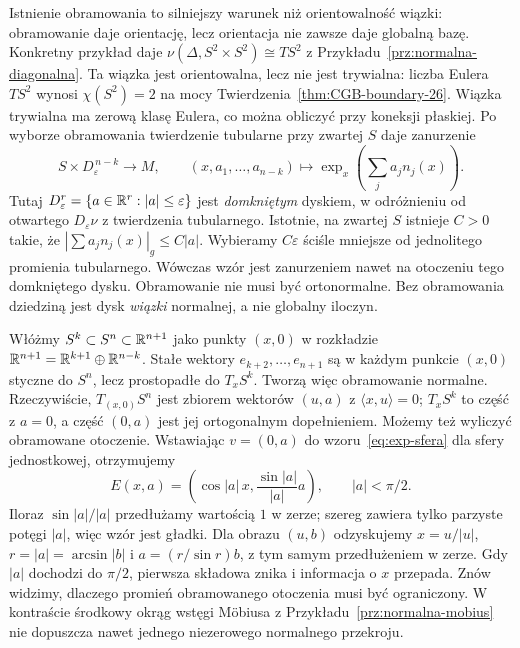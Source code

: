 Istnienie obramowania to silniejszy
warunek niż orientowalność wiązki:
obramowanie daje orientację, lecz
orientacja nie zawsze daje globalną
bazę. Konkretny przykład daje
$\nu(\Delta,S^2\times S^2)\cong TS^2$
z Przykładu~\ref{prz:normalna-diagonalna}.
Ta wiązka jest orientowalna, lecz nie jest trywialna:
liczba Eulera $TS^2$ wynosi $\chi(S^2)=2$
na mocy Twierdzenia~\ref{thm:CGB-boundary-26}.
Wiązka trywialna ma zerową klasę Eulera, co można obliczyć
przy koneksji płaskiej.
Po wyborze obramowania
twierdzenie tubularne przy zwartej
$S$ daje zanurzenie
\begin{equation}\label{eq:obramowany-dysk}
 S\times D^{\,n-k}_{\varepsilon}
 \longrightarrow M,\qquad
 (x,a_1,\ldots,a_{n-k})
 \longmapsto
 \exp_x\!\left(\sum_j a_jn_j(x)\right).
\end{equation}
Tutaj $D^r_\varepsilon=\{a\in\mathbb{R}^r:|a|\leq\varepsilon\}$
jest \emph{domkniętym} dyskiem, w odróżnieniu od otwartego
$D_\varepsilon\nu$ z twierdzenia tubularnego.
Istotnie, na zwartej $S$ istnieje $C>0$ takie, że
$|\sum a_jn_j(x)|_g\leq C|a|$. Wybieramy
$C\varepsilon$ ściśle mniejsze od jednolitego promienia
tubularnego. Wówczas wzór jest zanurzeniem nawet
na otoczeniu tego domkniętego dysku. Obramowanie
nie musi być ortonormalne.
Bez obramowania dziedziną jest
dysk \emph{wiązki} normalnej,
a nie globalny iloczyn.

\begin{przyklad}
Włóżmy $S^k\subset S^n\subset\mathbb{R}^{n+1}$
jako punkty $(x,0)$ w rozkładzie
$\mathbb{R}^{n+1}=\mathbb{R}^{k+1}\oplus\mathbb{R}^{n-k}$.
Stałe wektory $e_{k+2},\ldots,e_{n+1}$
są w każdym punkcie $(x,0)$ styczne
do $S^n$, lecz prostopadłe do $T_xS^k$.
Tworzą więc obramowanie normalne.
Rzeczywiście, $T_{(x,0)}S^n$ jest zbiorem wektorów
$(u,a)$ z $\langle x,u\rangle=0$;
$T_xS^k$ to część z $a=0$, a część $(0,a)$ jest jej
ortogonalnym dopełnieniem.
Możemy też wyliczyć obramowane otoczenie.
Wstawiając $v=(0,a)$ do wzoru~\eqref{eq:exp-sfera}
dla sfery jednostkowej, otrzymujemy
\[
 E(x,a)=\left(\cos|a|\,x,\frac{\sin|a|}{|a|}a\right),
 \qquad |a|<\pi/2.
\]
Iloraz $\sin|a|/|a|$ przedłużamy wartością $1$ w zerze;
szereg zawiera tylko parzyste potęgi $|a|$, więc wzór jest gładki.
Dla obrazu $(u,b)$ odzyskujemy $x=u/|u|$,
$r=|a|=\arcsin|b|$ i $a=(r/\sin r)b$, z tym samym
przedłużeniem w zerze.
Gdy $|a|$ dochodzi do $\pi/2$, pierwsza składowa znika
i informacja o $x$ przepada. Znów widzimy,
dlaczego promień obramowanego otoczenia musi być ograniczony.
W kontraście środkowy okrąg wstęgi
Möbiusa z Przykładu~\ref{prz:normalna-mobius}
nie dopuszcza nawet jednego
niezerowego normalnego przekroju.
\end{przyklad}

